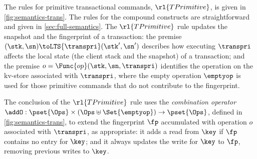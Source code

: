 \begin{figure*}[!t]
\begin{center}
\noindent
{}
\end{center}

\spaceshrink{-10pt}

\hrulefill

\caption{The semantics of transactional commands}
\label{fig:semantics-trans}
\end{figure*}
 
The rules for primitive transactional commands, \( \rl{TPrimitive} \),
is given in \cref{fig:semantics-trans}.
The rules for the compound constructs are straightforward and given in \cref{sec:full-semantics}.
The \( \rl{TPrimitive} \) rule updates 
the snapshot and the fingerprint of a transaction: the premise 
\((\stk, \sn) \toLTS{\transpri} (\stk', \sn')\) describes how executing
\(\transpri\) affects the local state (the client stack and the snapshot) of a transaction; 
and the premise \(o =\Func{op}(\stk, \sn, \transpri)\) identifies the operation on the kv-store associated with \(\transpri\), 
where the empty operation \(\emptyop\) is used for those primitive commands that do not
contribute to the fingerprint.

The conclusion of the \( \rl{TPrimitive}\)  rule uses the \emph{combination operator} 
\(\addO: \pset{\Ops} \times (\Ops \uplus \Set{\emptyop}) \to \pset{\Ops}\), defined 
in \cref{fig:semantics-trans}, to extend the fingerprint \(\fp\) accumulated with
operation \(o\) associated with \(\transpri\), as
appropriate: it adds  a read from \(\key\)  if \(\fp\) 
contains no entry for \(\key\); and it always updates the  write for 
\(\key\) to \(\fp\), removing previous writes to \(\key\).

